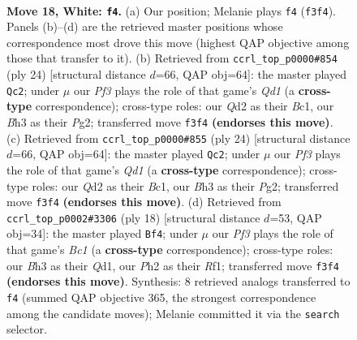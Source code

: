 \documentclass[11pt]{article}
\begin{document}
\clearpage

\begin{figure}[p]\centering
\begin{subfigure}{0.46\textwidth}\centering
\resizebox{\linewidth}{!}{%
\newchessgame
\chessboard[
  setfen={r1bq1rk1/2pn1pb1/1p1p1np1/3P3p/p1P5/2N2PPB/PPNQ3P/1RB2RK1 w - - 1 18},
  showmover=false,
  pgfstyle=straightmove, color=movearrow, markmove={f3-f4}
]}
\caption{}
\end{subfigure}\hfill
\begin{subfigure}{0.46\textwidth}\centering
\resizebox{\linewidth}{!}{%
\newchessgame
\chessboard[
  setfen={r1bqr1k1/3nbppp/p2p1n2/1ppP4/4P3/1PNB1N1P/P4PP1/R1BQ1RK1 w - - 1 13},
  showmover=false,
  pgfstyle=straightmove, color=movearrow, markmove={d1-c2}
]}
\caption{}
\end{subfigure}
\\[4pt]
\begin{subfigure}{0.46\textwidth}\centering
\resizebox{\linewidth}{!}{%
\newchessgame
\chessboard[
  setfen={r1bqr1k1/3nbppp/p2p1n2/1ppP4/4P3/1PNB1N1P/P4PP1/R1BQ1RK1 w - - 1 13},
  showmover=false,
  pgfstyle=straightmove, color=movearrow, markmove={d1-c2}
]}
\caption{}
\end{subfigure}\hfill
\begin{subfigure}{0.46\textwidth}\centering
\resizebox{\linewidth}{!}{%
\newchessgame
\chessboard[
  setfen={r1bq1rk1/pp1n1pbp/2pp1np1/8/2PNP3/2NB3P/PP3PP1/R1BQ1RK1 w - - 1 10},
  showmover=false,
  pgfstyle=straightmove, color=movearrow, markmove={c1-f4}
]}
\caption{}
\end{subfigure}
\caption{\textbf{Move 18, White: \texttt{f4}.} (a) Our position; Melanie plays \texttt{f4} (\texttt{f3f4}). Panels (b)--(d) are the retrieved master positions whose correspondence most drove this move (highest QAP objective among those that transfer to it). (b) Retrieved from \texttt{ccrl\_top\_p0000\#854} (ply 24) [structural distance $d$=66, QAP obj=64]: the master played \texttt{Qc2}; under $\mu$ our \emph{Pf3} plays the role of that game's \emph{Qd1} (a \textbf{cross-type} correspondence); cross-type roles: our \emph{Q}d2 as their \emph{B}c1, our \emph{B}h3 as their \emph{P}g2; transferred move \texttt{f3f4} \textbf{(endorses this move)}. (c) Retrieved from \texttt{ccrl\_top\_p0000\#855} (ply 24) [structural distance $d$=66, QAP obj=64]: the master played \texttt{Qc2}; under $\mu$ our \emph{Pf3} plays the role of that game's \emph{Qd1} (a \textbf{cross-type} correspondence); cross-type roles: our \emph{Q}d2 as their \emph{B}c1, our \emph{B}h3 as their \emph{P}g2; transferred move \texttt{f3f4} \textbf{(endorses this move)}. (d) Retrieved from \texttt{ccrl\_top\_p0002\#3306} (ply 18) [structural distance $d$=53, QAP obj=34]: the master played \texttt{Bf4}; under $\mu$ our \emph{Pf3} plays the role of that game's \emph{Bc1} (a \textbf{cross-type} correspondence); cross-type roles: our \emph{B}h3 as their \emph{Q}d1, our \emph{P}h2 as their \emph{R}f1; transferred move \texttt{f3f4} \textbf{(endorses this move)}. Synthesis: 8 retrieved analogs transferred to \texttt{f4} (summed QAP objective 365, the strongest correspondence among the candidate moves); Melanie committed it via the \texttt{search} selector.}

\end{figure}
\end{document}
